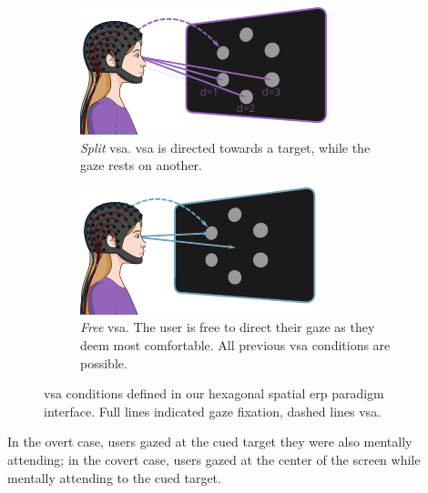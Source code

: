 \begin{figure}
  \begin{subfigure}[t]{.45\textwidth}
    \includegraphics[width=\textwidth]{figures/gaze_independence/attention_split.pdf}
    \caption[Split \ac{vsa}]{%
      \emph{Split} \ac{vsa}.
      \Ac{vsa} is directed towards a target, while the gaze rests on another.
    }
    \label{fig:gaze/vsa/split}
  \end{subfigure}\hfill%
   \begin{subfigure}[t]{.45\textwidth}
    \includegraphics[width=\textwidth]{figures/gaze_independence/attention_free.pdf}
    \caption[Free \ac{vsa}]{%
      \emph{Free} \ac{vsa}.
      The user is free to direct their gaze as they deem most comfortable.
      All previous \ac{vsa} conditions are possible.
    }
    \label{fig:gaze/vsa/free}
  \end{subfigure}\hfill%
  \caption[\Ac{vsa} conditions]{%
    \Acf{vsa} conditions defined in our hexagonal spatial \ac{erp} paradigm
    interface. Full lines indicated gaze fixation, dashed lines \ac{vsa}.
  }
  \label{fig:gaze/vsa}
\end{figure}
In the overt case, users gazed at the cued
target they were also mentally attending; in the covert case, users
gazed at the center of the screen while mentally attending to the cued target.

